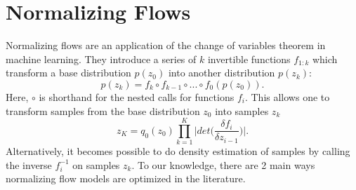 


\section{Normalizing Flows}

Normalizing flows are an application of the change of variables theorem in machine learning. They introduce a series of  $k$ invertible functions $f_{1:k}$ which transform a base distribution $p(z_{0})$ into another distribution $p(z_{k})$: 
\begin{equation}
p(z_{k}) = f_{k} \circ f_{k-1} \circ ... \circ f_{0}(p(z_{0})).
\end{equation} 
Here, $\circ$ is shorthand for the nested calls for functions $f_{i}$. This allows one to transform samples from the base distribution $z_{0}$ into samples $z_{k}$
\begin{equation}
	z_{K} = q_{0}(z_{0}) \prod_{k=1}^{K} \bigg|det \bigg(\frac{\delta f_{i}}{\delta z_{i-1}}\bigg) \bigg|.
\end{equation}
Alternatively, it becomes possible to do density estimation of samples by calling the inverse $f_{i}^{-1}$ on samples $z_{k}$. To our knowledge, there are 2 main ways normalizing flow models are optimized in the literature. 

